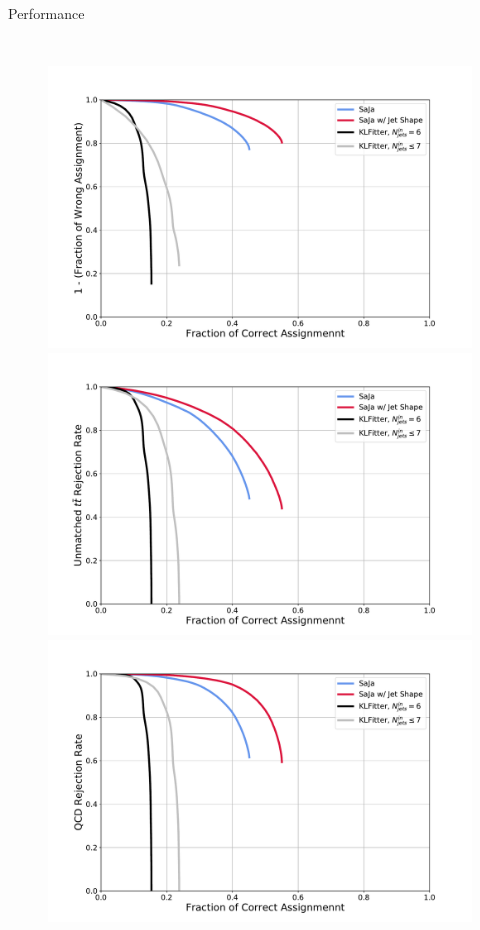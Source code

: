 \documentclass[10pt]{beamer}
\begin{document}
\begin{frame}[fragile]{Performance}
\begin{columns}
            \begin{figure}
            \centering
                \includegraphics[width=\textwidth]{figures/roc/wrong_rej_vs_mat_tt_acc.pdf}
                \includegraphics[width=\textwidth]{figures/roc/unmat_rej_vs_mat_tt_acc.pdf}
                \includegraphics[width=\textwidth]{figures/roc/qcd_rej_vs_mat_tt_acc.pdf}
            \end{figure}
    \end{columns}
\end{frame}
\end{document}
